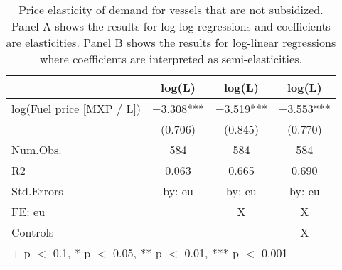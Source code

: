 \begin{table}

\caption{\label{tab:}Price elasticity of demand for vessels that are not subsidized.
  Panel A shows the results for log-log regressions and coefficients are
  elasticities. Panel B shows the results for log-linear regressions where
  coefficients are interpreted as semi-elasticities.}
\centering
\begin{tabular}[t]{lccc}
\toprule
  & log(L) & log(L)  & log(L)  \\
\midrule
log(Fuel price [MXP / L]) & \num{-3.308}*** & \num{-3.519}*** & \num{-3.553}***\\
 & (\num{0.706}) & (\num{0.845}) & (\num{0.770})\\
\midrule
Num.Obs. & \num{584} & \num{584} & \num{584}\\
R2 & \num{0.063} & \num{0.665} & \num{0.690}\\
Std.Errors & by: eu & by: eu & by: eu\\
FE: eu &  & X & X\\
Controls &  &  & X\\
\bottomrule
\multicolumn{4}{l}{\rule{0pt}{1em}+ p $<$ 0.1, * p $<$ 0.05, ** p $<$ 0.01, *** p $<$ 0.001}\\
\end{tabular}
\end{table}
